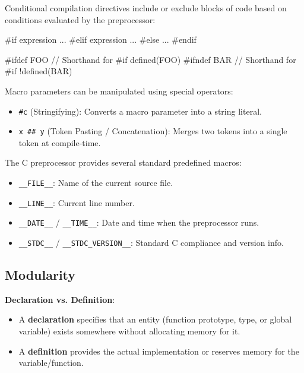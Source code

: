 \begin{remark}
    Conditional compilation directives include or exclude blocks of code based on conditions evaluated by the preprocessor:
\end{remark}

\begin{codeexample}
#if expression
    ...
#elif expression
    ...
#else
    ...
#endif

#ifdef FOO     // Shorthand for #if defined(FOO)
#ifndef BAR    // Shorthand for #if !defined(BAR)
\end{codeexample}

\begin{remark}
    Macro parameters can be manipulated using special operators:
    \begin{itemize}
        \item \texttt{\#c} (Stringifying): Converts a macro parameter into a string literal.
        \item \texttt{x \#\# y} (Token Pasting / Concatenation): Merges two tokens into a single token at compile-time.
    \end{itemize}
\end{remark}

\begin{remark}
    The C preprocessor provides several standard predefined macros:
    \begin{itemize}
        \item \texttt{\_\_FILE\_\_}: Name of the current source file.
        \item \texttt{\_\_LINE\_\_}: Current line number.
        \item \texttt{\_\_DATE\_\_} / \texttt{\_\_TIME\_\_}: Date and time when the preprocessor runs.
        \item \texttt{\_\_STDC\_\_} / \texttt{\_\_STDC\_VERSION\_\_}: Standard C compliance and version info.
    \end{itemize}
\end{remark}

\subsection{Modularity}

\begin{definition}
    \textbf{Declaration vs. Definition}:
    \begin{itemize}
        \item A \textbf{declaration} specifies that an entity (function prototype, type, or global variable) exists somewhere without allocating memory for it.
        \item A \textbf{definition} provides the actual implementation or reserves memory for the variable/function.
    \end{itemize}
\end{definition}

